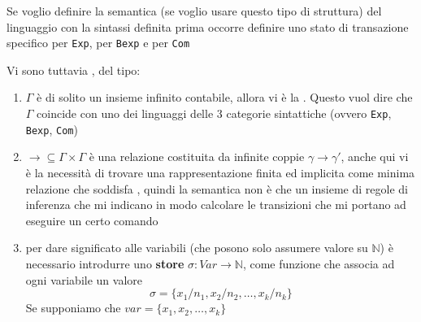 
Se voglio definire la semantica (se voglio usare questo tipo di struttura) del linguaggio con la sintassi definita prima occorre definire uno stato di transazione specifico per \texttt{Exp}, per \texttt{Bexp} e per \texttt{Com}

Vi sono tuttavia , del tipo:
\begin{enumerate}
    \item $\Gamma$ è di solito un insieme infinito contabile, allora vi è la . Questo vuol dire che $\Gamma$ coincide con uno dei linguaggi delle 3 categorie sintattiche (ovvero \texttt{Exp}, \texttt{Bexp}, \texttt{Com})
    \item $\rightarrow \subseteq \Gamma\times\Gamma$ è una relazione costituita da infinite coppie $\gamma \rightarrow \gamma'$, anche qui vi è la necessità di trovare una rappresentazione finita ed implicita come minima relazione che soddisfa , quindi la semantica non è che un insieme di regole di inferenza che mi indicano in modo calcolare le transizioni che mi portano ad eseguire un certo comando
    \item per dare significato alle variabili (che posono solo assumere valore su $\mathbb{N}$) è necessario introdurre uno \textbf{store} $\sigma:Var\rightarrow \mathbb{N}$, come funzione che associa ad ogni variabile un valore
    \[
        \sigma = \{x_1/n_1, x_2/n_2, \dots, x_k/n_k\}    
    \]
    Se supponiamo che $var = \{x_1, x_2, \dots, x_k\}$
\end{enumerate}


